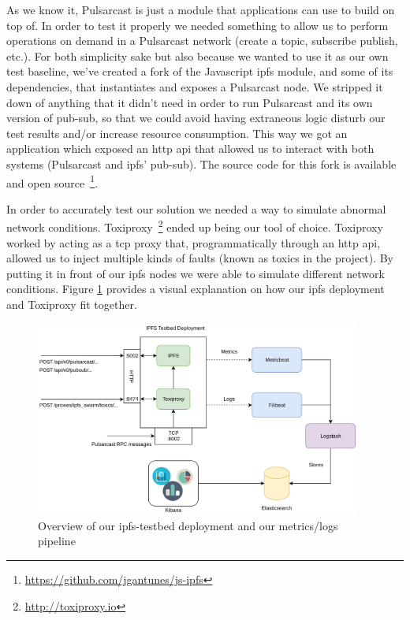 As we know it, Pulsarcast is just a module that applications can use to build
on top of. In order to test it properly we needed something to allow us to
perform operations on demand in a Pulsarcast network (create a topic, subscribe
publish, etc.). For both simplicity sake but also because we wanted to use it
as our own test baseline, we've created a fork of the Javascript
\acrshort{ipfs} module, and some of its dependencies, that instantiates and
exposes a Pulsarcast node.  We stripped it down of anything that it didn't need
in order to run Pulsarcast and its own version of pub-sub, so that we could
avoid having extraneous logic disturb our test results and/or increase resource
consumption. This way we got an application which exposed an \acrshort{http}
\acrshort{api} that allowed us to interact with both systems (Pulsarcast and
\acrshort{ipfs}' pub-sub). The source code for this fork is available and open
source~\footnote{\url{https://github.com/jgantunes/js-ipfs}}.

In order to accurately test our solution we needed a way to simulate abnormal
network conditions. Toxiproxy~\footnote{\url{http://toxiproxy.io}} ended up being our
tool of choice. Toxiproxy worked by acting as a \acrshort{tcp} proxy that,
programmatically through an \acrshort{http} \acrshort{api}, allowed us to
inject multiple kinds of faults (known as toxics in the project). By putting it
in front of our \acrshort{ipfs} nodes we were able to simulate different
network conditions.  Figure \ref{fig:ipfs-testbed-and-metrics} provides a
visual explanation on how our \acrshort{ipfs} deployment and Toxiproxy fit
together.

\begin{figure}[!htb]
  \centering
  \includegraphics[width=0.95\textwidth]{img/ipfs-testbed-and-metrics.png}
  \caption{Overview of our ipfs-testbed deployment and our metrics/logs
  pipeline}
  \label{fig:ipfs-testbed-and-metrics}
\end{figure}

